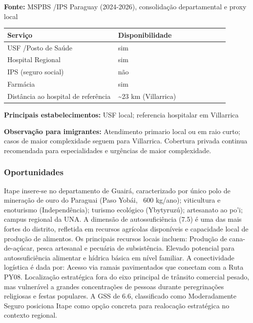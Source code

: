 \textbf{Fonte:} MSPBS /\allowbreak  IPS Paraguay (2024-2026), consolidação
departamental e proxy local

{\def\LTcaptype{none} %
\begin{longtable}{@{}>{\raggedright\arraybackslash}p{0.45\linewidth} >{\raggedright\arraybackslash}p{0.45\linewidth}@{}}
\toprule\noalign{}
Serviço & Disponibilidade \\
\midrule\noalign{}
\endhead
\bottomrule\noalign{}
\endlastfoot
USF /\allowbreak  Posto de Saúde & sim \\
Hospital Regional & sim \\
IPS (seguro social) & não \\
Farmácia & sim \\
Distância ao hospital de referência & \textasciitilde23 km
(Villarrica) \\
\end{longtable}
}

\textbf{Principais estabelecimentos:} USF local; referencia hospitalar
em Villarrica

\textbf{Observação para imigrantes:} Atendimento primario local ou em
raio curto; casos de maior complexidade seguem para Villarrica.
Cobertura privada continua recomendada para especialidades e urgências
de maior complexidade.
\newpage

\subsubsection*{Oportunidades}\label{oport-itape-0408}
Itape insere-se no departamento de Guairá, caracterizado por único polo de mineração de ouro do Paraguai (Paso Yobái, ~600 kg/ano); viticultura e enoturismo (Independência); turismo ecológico (Ybytyruzú); artesanato ao po'i; campus regional da UNA. A dimensão de autossuficiência (7.5) é uma das mais fortes do distrito, refletida em recursos agrícolas disponíveis e capacidade local de produção de alimentos. Os principais recursos locais incluem: Produção de cana-de-açúcar, pesca artesanal e pecuária de subsistência. Elevado potencial para autossuficiência alimentar e hídrica básica em nível familiar. A conectividade logística é dada por: Acesso via ramais pavimentados que conectam com a Ruta PY08. Localização estratégica fora do eixo principal de trânsito comercial pesado, mas vulnerável a grandes concentrações de pessoas durante peregrinações religiosas e festas populares. A GSS de 6.6, classificado como Moderadamente Seguro posiciona Itape como opção concreta para realocação estratégica no contexto regional.

